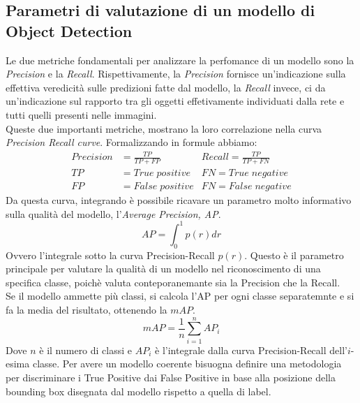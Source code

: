 \documentclass[12pt,a4paper,openright,twoside]{report}
\begin{document}
\subsection{Parametri di valutazione di un modello di Object Detection}
Le due metriche fondamentali per analizzare la perfomance di un modello sono la \emph{Precision} e la \emph{Recall}.
Rispettivamente, la \emph{Precision} fornisce un'indicazione sulla effettiva veredicità sulle predizioni fatte dal modello, la \emph{Recall} invece, ci da un'indicazione sul rapporto tra gli oggetti effetivamente individuati dalla rete e tutti quelli presenti nelle immagini.\\
Queste due importanti metriche, mostrano la loro correlazione nella curva \emph{Precision Recall curve}.
Formalizzando in formule abbiamo: 
\begin{align*}
Precision& = \frac{TP}{TP + FP}          &  Recall = \frac{TP}{TP + FN} \\
TP& = True \; positive    &  FN = True \; negative\\
FP& = False \; positive    &  FN = False \; negative
\end{align*}
Da questa curva, integrando è possibile ricavare un parametro molto informativo sulla qualità del modello, l'\emph{Average Precision, AP}.
\begin{equation}
    AP = \int_{0}^{1} p(r)dr
\end{equation}
Ovvero l'integrale sotto la curva Precision-Recall $p(r)$. Questo è il parametro principale per valutare la qualità di un modello nel riconoscimento di una specifica classe, poichè valuta conteporanemante sia la Precision che la Recall. \\
Se il modello ammette più classi, si calcola l'AP per ogni classe separatemnte e si fa la media del risultato, ottenendo la $mAP$.
\begin{equation}
    mAP = \frac{1}{n}\sum_{i=1}^{n}AP_{i}
\end{equation}
Dove $n$ è il numero di classi e $AP_{i}$ è l'integrale dalla curva Precision-Recall dell'$i$-esima classe.
Per avere un modello coerente bisuogna definire una metodologia per discriminare i True Positive dai False Positive in base alla posizione della bounding box disegnata dal modello rispetto a quella di label. \\
\end{document}
